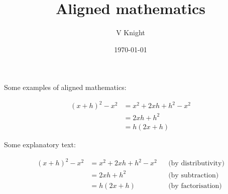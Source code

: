 \documentclass{article}
\title{Aligned mathematics}
\author{V Knight}
\date{\today}
\begin{document}
\maketitle

Some examples of aligned mathematics:

\begin{align}
    (x+h)^2-x^2 & =x^2+2xh+h^2-x^2 \nonumber\\
                & =2xh+h^2 \nonumber\\
                & =h(2x+h) \nonumber
\end{align}


Some explanatory text:

\begin{align}
    (x+h)^2-x^2 & = x^2+2xh+h^2-x^2 && \text{(by distributivity)}\\
                & = 2xh+h^2         && \text{(by subtraction)}\\
                & = h(2x+h)         && \text{(by factorisation)}
\end{align}
\end{document}
